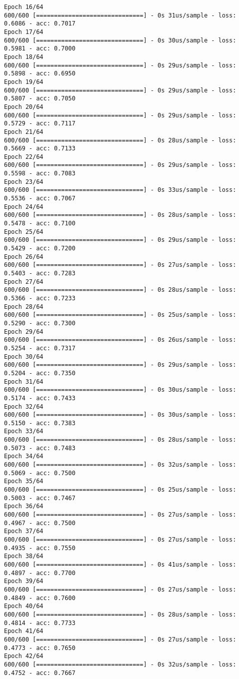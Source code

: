 \documentclass[11pt]{article}
\begin{document}
\begin{Verbatim}[commandchars=\\\{\}]
Epoch 16/64
600/600 [==============================] - 0s 31us/sample - loss: 0.6086 - acc: 0.7017
Epoch 17/64
600/600 [==============================] - 0s 30us/sample - loss: 0.5981 - acc: 0.7000
Epoch 18/64
600/600 [==============================] - 0s 29us/sample - loss: 0.5898 - acc: 0.6950
Epoch 19/64
600/600 [==============================] - 0s 29us/sample - loss: 0.5807 - acc: 0.7050
Epoch 20/64
600/600 [==============================] - 0s 29us/sample - loss: 0.5729 - acc: 0.7117
Epoch 21/64
600/600 [==============================] - 0s 28us/sample - loss: 0.5669 - acc: 0.7133
Epoch 22/64
600/600 [==============================] - 0s 29us/sample - loss: 0.5598 - acc: 0.7083
Epoch 23/64
600/600 [==============================] - 0s 33us/sample - loss: 0.5536 - acc: 0.7067
Epoch 24/64
600/600 [==============================] - 0s 28us/sample - loss: 0.5478 - acc: 0.7100
Epoch 25/64
600/600 [==============================] - 0s 29us/sample - loss: 0.5429 - acc: 0.7200
Epoch 26/64
600/600 [==============================] - 0s 27us/sample - loss: 0.5403 - acc: 0.7283
Epoch 27/64
600/600 [==============================] - 0s 28us/sample - loss: 0.5366 - acc: 0.7233
Epoch 28/64
600/600 [==============================] - 0s 25us/sample - loss: 0.5290 - acc: 0.7300
Epoch 29/64
600/600 [==============================] - 0s 26us/sample - loss: 0.5254 - acc: 0.7317
Epoch 30/64
600/600 [==============================] - 0s 29us/sample - loss: 0.5204 - acc: 0.7350
Epoch 31/64
600/600 [==============================] - 0s 30us/sample - loss: 0.5174 - acc: 0.7433
Epoch 32/64
600/600 [==============================] - 0s 30us/sample - loss: 0.5150 - acc: 0.7383
Epoch 33/64
600/600 [==============================] - 0s 28us/sample - loss: 0.5073 - acc: 0.7483
Epoch 34/64
600/600 [==============================] - 0s 32us/sample - loss: 0.5069 - acc: 0.7500
Epoch 35/64
600/600 [==============================] - 0s 25us/sample - loss: 0.5003 - acc: 0.7467
Epoch 36/64
600/600 [==============================] - 0s 27us/sample - loss: 0.4967 - acc: 0.7500
Epoch 37/64
600/600 [==============================] - 0s 27us/sample - loss: 0.4935 - acc: 0.7550
Epoch 38/64
600/600 [==============================] - 0s 41us/sample - loss: 0.4897 - acc: 0.7700
Epoch 39/64
600/600 [==============================] - 0s 27us/sample - loss: 0.4849 - acc: 0.7600
Epoch 40/64
600/600 [==============================] - 0s 28us/sample - loss: 0.4814 - acc: 0.7733
Epoch 41/64
600/600 [==============================] - 0s 27us/sample - loss: 0.4773 - acc: 0.7650
Epoch 42/64
600/600 [==============================] - 0s 32us/sample - loss: 0.4752 - acc: 0.7667

\end{Verbatim}
\end{document}
